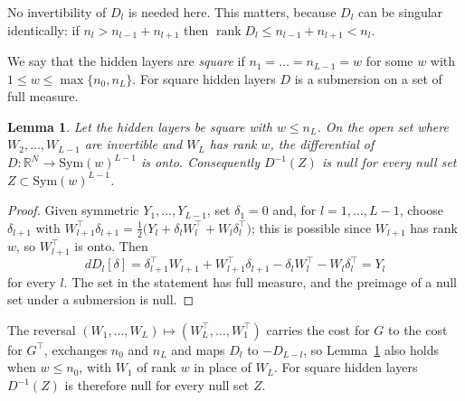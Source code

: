 \documentclass[11pt]{amsart}
\newtheorem{lemma}[theorem]{Lemma}
\theoremstyle{definition}
\theoremstyle{remark}
\numberwithin{equation}{section}
\newcommand{\RR}{\mathbb{R}}
\DeclareMathOperator{\rank}{rank}
\begin{document}
No invertibility of $D_l$ is needed here. This matters, because $D_l$ can be singular identically: if $n_l>n_{l-1}+n_{l+1}$ then $\rank D_l\le n_{l-1}+n_{l+1}<n_l$.

We say that the hidden layers are \emph{square} if $n_1=\dots=n_{L-1}=w$ for some $w$ with $1\le w\le\max\{n_0,n_L\}$. For square hidden layers $D$ is a submersion on a set of full measure.

\begin{lemma}\label{lem:submersion}
Let the hidden layers be square with $w\le n_L$. On the open set where $W_2,\dots,W_{L-1}$ are invertible and $W_L$ has rank $w$, the differential of $D\colon\RR^N\to\mathrm{Sym}(w)^{L-1}$ is onto. Consequently $D^{-1}(Z)$ is null for every null set $Z\subset\mathrm{Sym}(w)^{L-1}$.
\end{lemma}
\begin{proof}
Given symmetric $Y_1,\dots,Y_{L-1}$, set $\delta_1=0$ and, for $l=1,\dots,L-1$, choose $\delta_{l+1}$ with $W_{l+1}^\top\delta_{l+1}=\tfrac12\bigl(Y_l+\delta_lW_l^\top+W_l\delta_l^\top\bigr)$; this is possible since $W_{l+1}$ has rank $w$, so $W_{l+1}^\top$ is onto. Then
\[
dD_l[\delta]=\delta_{l+1}^\top W_{l+1}+W_{l+1}^\top\delta_{l+1}-\delta_lW_l^\top-W_l\delta_l^\top=Y_l
\]
for every $l$. The set in the statement has full measure, and the preimage of a null set under a submersion is null.
\end{proof}
The reversal $(W_1,\dots,W_L)\mapsto(W_L^\top,\dots,W_1^\top)$ carries the cost for $G$ to the cost for $G^\top$, exchanges $n_0$ and $n_L$ and maps $D_l$ to $-D_{L-l}$, so Lemma~\ref{lem:submersion} also holds when $w\le n_0$, with $W_1$ of rank $w$ in place of $W_L$. For square hidden layers $D^{-1}(Z)$ is therefore null for every null set $Z$.
\end{document}

